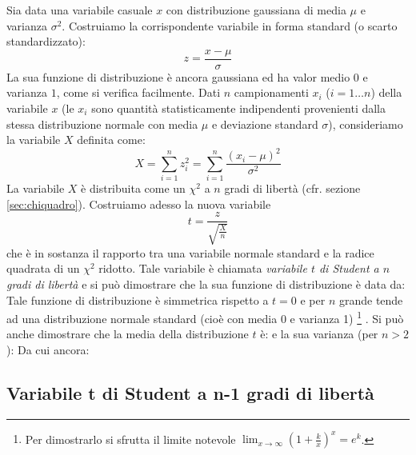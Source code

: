 Sia data una variabile casuale $x$ con
distribuzione gaussiana di media $\mu$ e varianza $\sigma^2$.
Costruiamo la corrispondente variabile in forma standard (o
scarto standardizzato):
$$
z= \frac{x-\mu}{\sigma}
$$
La sua funzione di distribuzione \`e ancora gaussiana ed ha valor medio
$0$ e varianza $1$, come si verifica facilmente.
Dati $n$ campionamenti $x_i$ ($i = 1 \ldots n$) della variabile $x$
(le $x_i$ sono quantit\`a statisticamente indipendenti provenienti
dalla stessa distribuzione normale con media $\mu$ e deviazione
standard $\sigma$), consideriamo la variabile $X$ definita come:
$$
X = \sum_{i=1}^{n}z_i^2 = \sum_{i=1}^{n} \frac{(x_i-\mu)^2}{\sigma^2}
$$
La variabile $X$ \`e distribuita come un $\chi^2$ a $n$ gradi di libert\`a
(cfr. sezione \ref{sec:chiquadro}). Costruiamo adesso la nuova variabile
$$
t=\frac{z}{\displaystyle \sqrt{\frac{X}{n}}}
$$
che \`e in sostanza il rapporto tra una variabile normale standard e la radice
quadrata di un $\chi^2$ ridotto. Tale variabile \`e
chiamata {\itshape  variabile $t$ di Student a $n$ gradi di libert\`a}
e si pu\`o dimostrare che la sua funzione di distribuzione \`e data da:
Tale funzione di distribuzione \`e simmetrica rispetto a $t=0$ e per
$n$ grande tende ad una distribuzione normale standard (cio\`e
con media 0 e varianza 1)%
\footnote{
Per dimostrarlo si sfrutta il limite notevole
$\displaystyle \lim_{x\rightarrow \infty} \left( 1+\frac{k}{x} \right)^x=e^k$.
}%
.
Si pu\`o anche dimostrare che la media della distribuzione $t$ \`e:
e la sua varianza (per $n>2$):
Da cui ancora:


\subsection{Variabile t di Student a n-1 gradi di libert\`a}

